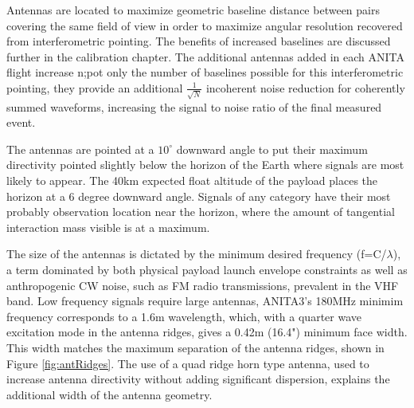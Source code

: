 	Antennas are located to maximize geometric baseline distance between pairs covering the same field of view in order to maximize angular resolution recovered from interferometric pointing.  The benefits of increased baselines are discussed further in the calibration chapter.  The additional antennas added in each ANITA flight increase n;pot only the number of baselines possible for this interferometric pointing, they provide an additional $\frac{1}{\sqrt{N}}$ incoherent noise reduction for coherently summed waveforms, increasing the signal to noise ratio of the final measured event.  
	
	The antennas are pointed at a $10^{\circ}$ downward angle to put their maximum directivity pointed slightly below the horizon of the Earth where signals are most likely to appear.  The 40km expected float altitude of the payload places the horizon at a 6 degree downward angle.  Signals of any category have their most probably observation location near the horizon, where the amount of tangential interaction mass visible is at a maximum.
	
	The size of the antennas is dictated by the minimum desired frequency (f=C/$\lambda$), a term dominated by both physical payload launch envelope constraints as well as anthropogenic CW noise, such as FM radio transmissions, prevalent in the VHF band. Low frequency signals require large antennas, ANITA3's 180MHz minimim frequency corresponds to a 1.6m wavelength, which, with a quarter wave excitation mode in the antenna ridges, gives a 0.42m (16.4") minimum face width.  This width matches the maximum separation of the antenna ridges, shown in Figure \ref{fig:antRidges}.  The use of a quad ridge horn type antenna, used to increase antenna directivity without adding significant dispersion, explains the additional width of the antenna geometry.
	
